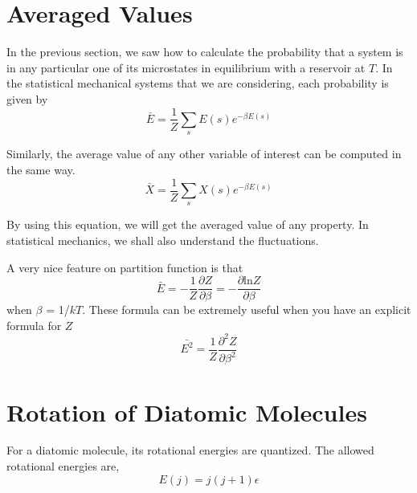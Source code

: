
\section{Averaged Values}
In the previous section, we saw how to calculate the probability that a system is in any particular one of its
microstates in equilibrium with a reservoir at $T$. In the statistical mechanical systems that we are considering,
each probability is given by 
\begin{equation}
\bar{E} = \frac{1}{Z} \sum_s E(s)e^{-\beta E(s)}
\end{equation}

Similarly, the average value of any other variable of interest can be computed in the same way.
\begin{equation}
\bar{X} = \frac{1}{Z} \sum_s X(s)e^{-\beta E(s)}
\end{equation}

By using this equation, we will get the averaged value of any property. In statistical mechanics, we shall also
understand the fluctuations.

A very nice feature on partition function is that 
\begin{equation}
\bar{E} = -\frac{1}{Z} \frac{\partial{Z}}{\partial{\beta}} = -\frac{\partial{\text{ln}Z}}{\partial {\beta}}
\end{equation}
when $\beta$ = 1/$kT$. These formula can be extremely useful when you have an explicit formula for $Z$
\begin{equation}
\bar{E^2} = \frac{1}{Z} \frac{\partial^2{Z}}{\partial{\beta^2}} 
\end{equation}


\section{Rotation of Diatomic Molecules}
For a diatomic molecule, its rotational energies are quantized. The allowed rotational energies are,
\begin{equation}
E(j) = j(j+1)\epsilon
\end{equation}


